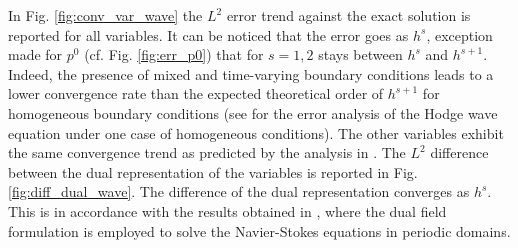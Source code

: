 \documentclass{elsarticle}
\begin{document}
In Fig. \ref{fig:conv_var_wave} the $L^2$ error trend against the exact solution is reported for all variables. It can be noticed that the error goes as $h^s$, exception made for $p^0$ (cf. Fig. \ref{fig:err_p0}) that for $s=1, 2$ stays between $h^s$ and $h^{s+1}$. Indeed, the presence of mixed and time-varying boundary conditions leads to a lower convergence rate than the expected theoretical order of $h^{s+1}$ for homogeneous boundary conditions (see \cite{wu2021hodgewave} for the error analysis of the Hodge wave equation under one case of homogeneous conditions). The other variables exhibit the same convergence trend as predicted by the analysis in \cite{wu2021hodgewave}. The $L^2$ difference between the dual representation of the variables is reported in Fig. \ref{fig:diff_dual_wave}. The difference of the dual representation converges as $h^s$. This is in accordance with the results obtained in \cite{zhang2021mass}, where the dual field formulation is employed to solve the Navier-Stokes equations in periodic domains.
 
\end{document}
